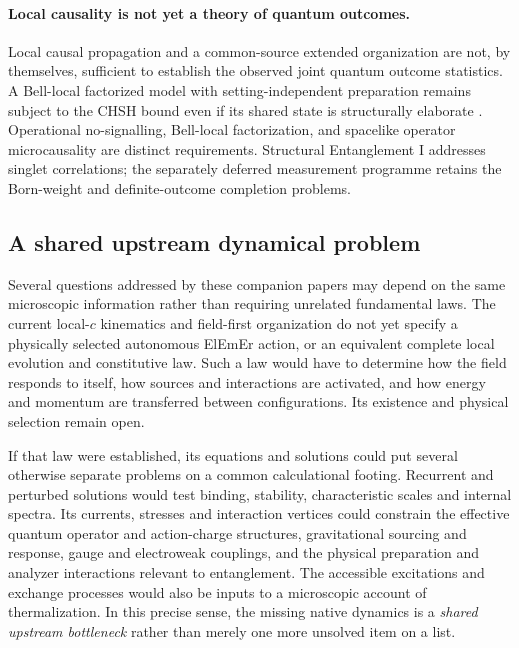 \documentclass[11pt]{article}
\theoremstyle{definition}
\newcommand{\ElEmEr}{\mbox{ElEmEr}}
\begin{document}
\paragraph{Local causality is not yet a theory of quantum outcomes.}
Local causal propagation and a common-source extended organization are not,
by themselves, sufficient to establish the observed joint quantum outcome statistics.
A Bell-local factorized model with setting-independent preparation remains subject
to the CHSH bound even if its shared state is structurally elaborate
\cite{Bell1964,CHSH1969}.  Operational
no-signalling, Bell-local factorization, and spacelike operator microcausality are
distinct requirements.  Structural Entanglement I addresses singlet correlations;
the separately deferred measurement programme retains the Born-weight and
definite-outcome completion problems.

\subsection{A shared upstream dynamical problem}
\label{subsec:shared-native-dynamics}

Several questions addressed by these companion papers may depend on the same
microscopic information rather than requiring unrelated fundamental laws.
The current local-$c$ kinematics and field-first organization do not yet specify
a physically selected autonomous \ElEmEr{} action, or an equivalent complete
local evolution and constitutive law.  Such a law would have to determine how
the field responds to itself, how sources and interactions are activated, and
how energy and momentum are transferred between configurations.  Its existence
and physical selection remain open.

If that law were established, its equations and solutions could put several
otherwise separate problems on a common calculational footing.  Recurrent and
perturbed solutions would test binding, stability, characteristic scales and
internal spectra.  Its currents, stresses and interaction vertices could
constrain the effective quantum operator and action-charge structures,
gravitational sourcing and response, gauge and electroweak couplings, and the
physical preparation and analyzer interactions relevant to entanglement.
The accessible excitations and exchange processes would also be inputs to a
microscopic account of thermalization.  In this precise sense, the missing
native dynamics is a \emph{shared upstream bottleneck} rather than merely one
more unsolved item on a list.
\end{document}
